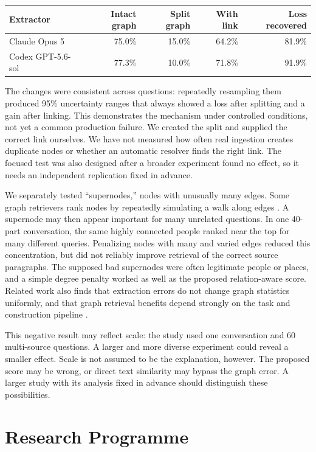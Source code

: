 \documentclass[10pt]{article}
\begin{document}
\begin{center}
\small
\begin{tabular}{lrrrr}
\toprule
Extractor & Intact graph & Split graph & With link & Loss recovered \\
\midrule
Claude Opus 5 & 75.0\% & 15.0\% & 64.2\% & 81.9\% \\
Codex GPT-5.6-sol & 77.3\% & 10.0\% & 71.8\% & 91.9\% \\
\bottomrule
\end{tabular}
\end{center}

\newpage
The changes were consistent across questions: repeatedly resampling them produced 95\%
uncertainty ranges that always showed a loss after splitting and a gain after linking.
This demonstrates the mechanism under controlled conditions, not yet a common
production failure. We created the split and supplied the correct link ourselves. We
have not measured how often real ingestion creates duplicate nodes or whether an
automatic resolver finds the right link. The focused test was also designed after a
broader experiment found no effect, so it needs an independent replication fixed in
advance.

We separately tested ``supernodes,'' nodes with unusually many edges. Some graph
retrievers rank nodes by repeatedly simulating a walk along edges \cite{hipporag,hipporag2}.
A supernode may then appear important for many unrelated questions. In one 40-part
conversation, the same highly connected people ranked near the top for many different
queries. Penalizing nodes with many and varied edges reduced this concentration, but
did not reliably improve retrieval of the correct source paragraphs. The supposed bad
supernodes were often legitimate people or places, and a simple degree penalty worked
as well as the proposed relation-aware score. Related work also finds that extraction
errors do not change graph statistics uniformly, and that graph retrieval benefits
depend strongly on the task and construction pipeline \cite{cai,graphbench}.

This negative result may reflect scale: the study used one conversation and 60
multi-source questions. A larger and more diverse experiment could reveal a smaller
effect. Scale is not assumed to be the explanation, however. The proposed score may
be wrong, or direct text similarity may bypass the graph error. A larger study with
its analysis fixed in advance should distinguish these possibilities.

\section{Research Programme}
\end{document}

